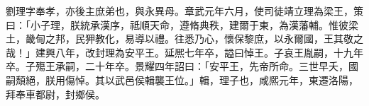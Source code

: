 
\begin{pinyinscope}
劉理字奉孝，亦後主庶弟也，與永異母。章武元年六月，使司徒靖立理為梁王，策曰：「小子理，朕統承漢序，祗順天命，遵脩典秩，建爾于東，為漢藩輔。惟彼梁土，畿甸之邦，民狎教化，易導以禮。往悉乃心，懷保黎庶，以永爾國，王其敬之哉！」建興八年，改封理為安平王。延熈七年卒，謚曰悼王。子哀王胤嗣，十九年卒。子殤王承嗣，二十年卒。景耀四年詔曰：「安平王，先帝所命。三世早夭，國嗣頹絕，朕用傷悼。其以武邑侯輯襲王位。」輯，理子也，咸熈元年，東遷洛陽，拜奉車都尉，封鄉侯。


\end{pinyinscope}